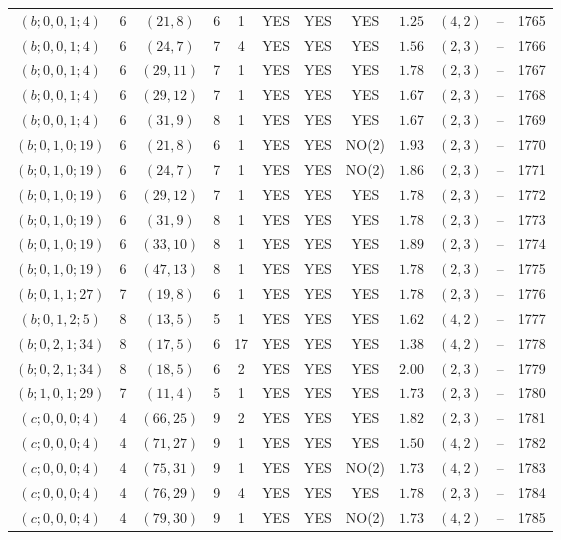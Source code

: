 \begin{longtable}{|c|c|c|c|c|c|c|c|c|c|c|c|}
$(b;0,0,1;4)$ & 6 & $(21,8)$ & 6 & 1 & YES & YES & YES & $1.25$ & $(4,2)$ & -- & 1765\\
$(b;0,0,1;4)$ & 6 & $(24,7)$ & 7 & 4 & YES & YES & YES & $1.56$ & $(2,3)$ & -- & 1766\\
$(b;0,0,1;4)$ & 6 & $(29,11)$ & 7 & 1 & YES & YES & YES & $1.78$ & $(2,3)$ & -- & 1767\\
$(b;0,0,1;4)$ & 6 & $(29,12)$ & 7 & 1 & YES & YES & YES & $1.67$ & $(2,3)$ & -- & 1768\\
$(b;0,0,1;4)$ & 6 & $(31,9)$ & 8 & 1 & YES & YES & YES & $1.67$ & $(2,3)$ & -- & 1769\\
$(b;0,1,0;19)$ & 6 & $(21,8)$ & 6 & 1 & YES & YES & NO(2) & $1.93$ & $(2,3)$ & -- & 1770\\
$(b;0,1,0;19)$ & 6 & $(24,7)$ & 7 & 1 & YES & YES & NO(2) & $1.86$ & $(2,3)$ & -- & 1771\\
$(b;0,1,0;19)$ & 6 & $(29,12)$ & 7 & 1 & YES & YES & YES & $1.78$ & $(2,3)$ & -- & 1772\\
$(b;0,1,0;19)$ & 6 & $(31,9)$ & 8 & 1 & YES & YES & YES & $1.78$ & $(2,3)$ & -- & 1773\\
$(b;0,1,0;19)$ & 6 & $(33,10)$ & 8 & 1 & YES & YES & YES & $1.89$ & $(2,3)$ & -- & 1774\\
$(b;0,1,0;19)$ & 6 & $(47,13)$ & 8 & 1 & YES & YES & YES & $1.78$ & $(2,3)$ & -- & 1775\\
$(b;0,1,1;27)$ & 7 & $(19,8)$ & 6 & 1 & YES & YES & YES & $1.78$ & $(2,3)$ & -- & 1776\\
$(b;0,1,2;5)$ & 8 & $(13,5)$ & 5 & 1 & YES & YES & YES & $1.62$ & $(4,2)$ & -- & 1777\\
$(b;0,2,1;34)$ & 8 & $(17,5)$ & 6 & 17 & YES & YES & YES & $1.38$ & $(4,2)$ & -- & 1778\\
$(b;0,2,1;34)$ & 8 & $(18,5)$ & 6 & 2 & YES & YES & YES & $2.00$ & $(2,3)$ & -- & 1779\\
$(b;1,0,1;29)$ & 7 & $(11,4)$ & 5 & 1 & YES & YES & YES & $1.73$ & $(2,3)$ & -- & 1780\\
$(c;0,0,0;4)$ & 4 & $(66,25)$ & 9 & 2 & YES & YES & YES & $1.82$ & $(2,3)$ & -- & 1781\\
$(c;0,0,0;4)$ & 4 & $(71,27)$ & 9 & 1 & YES & YES & YES & $1.50$ & $(4,2)$ & -- & 1782\\
$(c;0,0,0;4)$ & 4 & $(75,31)$ & 9 & 1 & YES & YES & NO(2) & $1.73$ & $(4,2)$ & -- & 1783\\
$(c;0,0,0;4)$ & 4 & $(76,29)$ & 9 & 4 & YES & YES & YES & $1.78$ & $(2,3)$ & -- & 1784\\
$(c;0,0,0;4)$ & 4 & $(79,30)$ & 9 & 1 & YES & YES & NO(2) & $1.73$ & $(4,2)$ & -- & 1785\\

\end{longtable}
